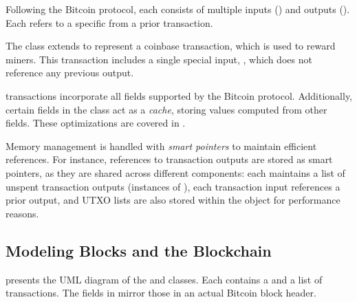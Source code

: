Following the Bitcoin protocol, each  consists of multiple
inputs () and outputs (). Each
 refers to a specific  from a
prior transaction.

The  class extends  to represent a coinbase
transaction, which is used to reward miners. This transaction includes a single
special input, , which does not reference any previous
output.

\iblock{} transactions incorporate all fields supported by the Bitcoin
protocol. Additionally, certain fields in the  class act as a
\emph{cache}, storing values computed from other fields. These optimizations
are covered in .

Memory management is handled with \emph{smart pointers} to maintain efficient
references. For instance, references to transaction outputs are stored as smart
pointers, as they are shared across different components: each 
maintains a list of unspent transaction outputs (instances of
), each transaction input references a prior output,
and UTXO lists are also stored within the  object for performance
reasons.

\subsection{Modeling Blocks and the Blockchain}\label{subsec:impl-blocks}

 presents the UML diagram of the  and
 classes. Each  contains a  and
a list of transactions. The fields in  mirror those in an
actual Bitcoin block header.

